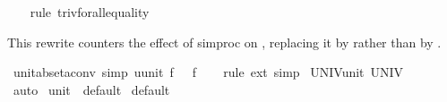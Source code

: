 \begin{isabellebody}
%
\isadelimproof
\ \ %
\endisadelimproof
%
\isatagproof
{}\isamarkupfalse%
\ {\isacharparenleft}{\kern0pt}rule\ triv{\isacharunderscore}{\kern0pt}forall{\isacharunderscore}{\kern0pt}equality{\isacharparenright}{\kern0pt}%
\endisatagproof
{\isafoldproof}%
%
\isadelimproof
%
\endisadelimproof
%
\begin{isamarkuptext}%
This rewrite counters the effect of simproc  on , replacing it by  rather than by .%
\end{isamarkuptext}\isamarkuptrue%
\isamarkupfalse%
\ unit{\isacharunderscore}{\kern0pt}abs{\isacharunderscore}{\kern0pt}eta{\isacharunderscore}{\kern0pt}conv\ {\isacharbrackleft}{\kern0pt}simp{\isacharbrackright}{\kern0pt}{\isacharcolon}{\kern0pt}\ {\isachardoublequoteopen}{\isacharparenleft}{\kern0pt}{\isasymlambda}u{\isacharcolon}{\kern0pt}{\isacharcolon}{\kern0pt}unit{\isachardot}{\kern0pt}\ f\ {\isacharparenleft}{\kern0pt}{\isacharparenright}{\kern0pt}{\isacharparenright}{\kern0pt}\ {\isacharequal}{\kern0pt}\ f{\isachardoublequoteclose}\isanewline
%
\isadelimproof
\ \ %
\endisadelimproof
%
\isatagproof
{}\isamarkupfalse%
\ {\isacharparenleft}{\kern0pt}rule\ ext{\isacharparenright}{\kern0pt}\ simp%
\endisatagproof
{\isafoldproof}%
%
\isadelimproof
\isanewline
%
\endisadelimproof
\isanewline
{}\isamarkupfalse%
\ UNIV{\isacharunderscore}{\kern0pt}unit{\isacharcolon}{\kern0pt}\ {\isachardoublequoteopen}UNIV\ {\isacharequal}{\kern0pt}\ {\isacharbraceleft}{\kern0pt}{\isacharparenleft}{\kern0pt}{\isacharparenright}{\kern0pt}{\isacharbraceright}{\kern0pt}{\isachardoublequoteclose}\isanewline
%
\isadelimproof
\ \ %
\endisadelimproof
%
\isatagproof
{}\isamarkupfalse%
\ auto%
\endisatagproof
{\isafoldproof}%
%
\isadelimproof
\isanewline
%
\endisadelimproof
\isanewline
{}\isamarkupfalse%
\ unit\ {\isacharcolon}{\kern0pt}{\isacharcolon}{\kern0pt}\ default\isanewline
{}\isanewline
\isanewline
{}\isamarkupfalse%
\ {\isachardoublequoteopen}default\ {\isacharequal}{\kern0pt}\ {\isacharparenleft}{\kern0pt}{\isacharparenright}{\kern0pt}{\isachardoublequoteclose}\isanewline
\isanewline

\end{isabellebody}

